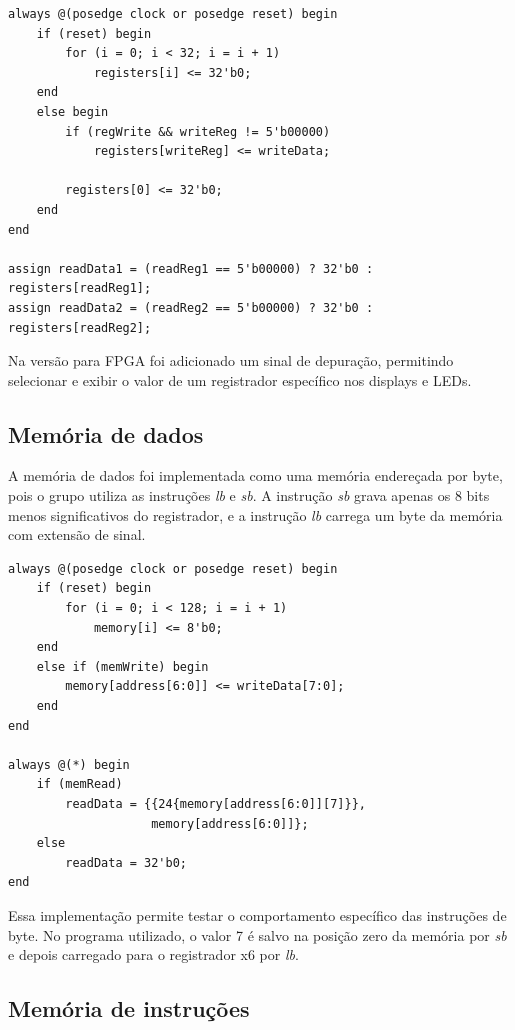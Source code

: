 \documentclass[12pt,a4paper]{article}
\begin{document}
\begin{lstlisting}[style=verilogstyle,caption={Escrita no banco de registradores.}]
always @(posedge clock or posedge reset) begin
    if (reset) begin
        for (i = 0; i < 32; i = i + 1)
            registers[i] <= 32'b0;
    end
    else begin
        if (regWrite && writeReg != 5'b00000)
            registers[writeReg] <= writeData;

        registers[0] <= 32'b0;
    end
end

assign readData1 = (readReg1 == 5'b00000) ? 32'b0 : registers[readReg1];
assign readData2 = (readReg2 == 5'b00000) ? 32'b0 : registers[readReg2];
\end{lstlisting}

Na versão para FPGA foi adicionado um sinal de depuração, permitindo selecionar e exibir o valor de um registrador específico nos displays e LEDs.

\subsection{Memória de dados}

A memória de dados foi implementada como uma memória endereçada por byte, pois o grupo utiliza as instruções \textit{lb} e \textit{sb}. A instrução \textit{sb} grava apenas os 8 bits menos significativos do registrador, e a instrução \textit{lb} carrega um byte da memória com extensão de sinal.

\begin{lstlisting}[style=verilogstyle,caption={Leitura e escrita de byte na memória de dados.}]
always @(posedge clock or posedge reset) begin
    if (reset) begin
        for (i = 0; i < 128; i = i + 1)
            memory[i] <= 8'b0;
    end
    else if (memWrite) begin
        memory[address[6:0]] <= writeData[7:0];
    end
end

always @(*) begin
    if (memRead)
        readData = {{24{memory[address[6:0]][7]}},
                    memory[address[6:0]]};
    else
        readData = 32'b0;
end
\end{lstlisting}

Essa implementação permite testar o comportamento específico das instruções de byte. No programa utilizado, o valor 7 é salvo na posição zero da memória por \textit{sb} e depois carregado para o registrador x6 por \textit{lb}.

\subsection{Memória de instruções}
\end{document}
